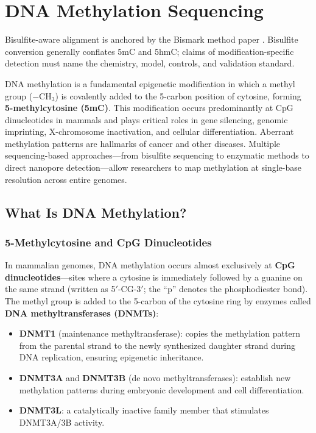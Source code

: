 \chapter{DNA Methylation Sequencing}
\label{ch:methylation}

\begin{sourcebox}
Bisulfite-aware alignment is anchored by the Bismark method paper \cite{krueger2011}. Bisulfite conversion generally conflates 5mC and 5hmC; claims of modification-specific detection must name the chemistry, model, controls, and validation standard.
\end{sourcebox}

\begin{keyconcept}
DNA methylation is a fundamental epigenetic modification in which a methyl group ($-\text{CH}_3$) is covalently added to the 5-carbon position of cytosine, forming \textbf{5-methylcytosine (5mC)}. This modification occurs predominantly at CpG dinucleotides in mammals and plays critical roles in gene silencing, genomic imprinting, X-chromosome inactivation, and cellular differentiation. Aberrant methylation patterns are hallmarks of cancer and other diseases. Multiple sequencing-based approaches---from bisulfite sequencing to enzymatic methods to direct nanopore detection---allow researchers to map methylation at single-base resolution across entire genomes.
\end{keyconcept}

\section{What Is DNA Methylation?}
\label{sec:methylation:what}

\subsection{5-Methylcytosine and CpG Dinucleotides}
\label{subsec:methylation:5mc}

In mammalian genomes, DNA methylation occurs almost exclusively at \textbf{CpG dinucleotides}---sites where a cytosine is immediately followed by a guanine on the same strand (written as 5$'$-CG-3$'$; the ``p'' denotes the phosphodiester bond). The methyl group is added to the 5-carbon of the cytosine ring by enzymes called \textbf{DNA methyltransferases (DNMTs)}:

\begin{itemize}[itemsep=2pt]
  \item \textbf{DNMT1} (maintenance methyltransferase): copies the methylation pattern from the parental strand to the newly synthesized daughter strand during DNA replication, ensuring epigenetic inheritance.
  \item \textbf{DNMT3A} and \textbf{DNMT3B} (de novo methyltransferases): establish new methylation patterns during embryonic development and cell differentiation.
  \item \textbf{DNMT3L}: a catalytically inactive family member that stimulates DNMT3A/3B activity.
\end{itemize}

